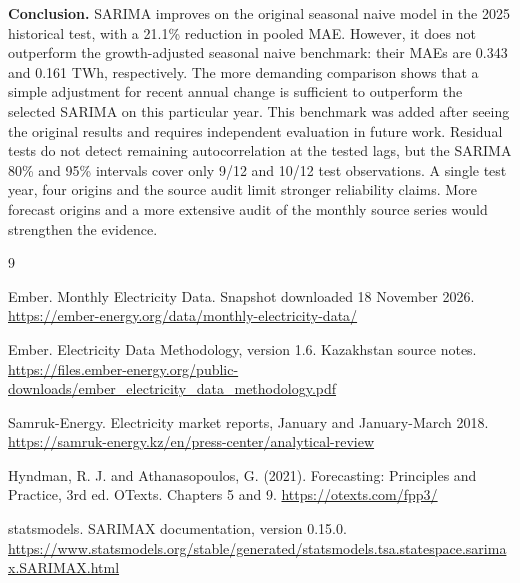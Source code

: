 \documentclass[11pt,a4paper,twoside,reqno]{amsart}
\numberwithin{equation}{section}
\begin{document}
\textbf{Conclusion.} SARIMA improves on the original seasonal naive model in the 2025 historical test, with a 21.1\% reduction in pooled MAE. However, it does not outperform the growth-adjusted seasonal naive benchmark: their MAEs are 0.343 and 0.161 TWh, respectively. The more demanding comparison shows that a simple adjustment for recent annual change is sufficient to outperform the selected SARIMA on this particular year. This benchmark was added after seeing the original results and requires independent evaluation in future work. Residual tests do not detect remaining autocorrelation at the tested lags, but the SARIMA 80\% and 95\% intervals cover only 9/12 and 10/12 test observations. A single test year, four origins and the source audit limit stronger reliability claims. More forecast origins and a more extensive audit of the monthly source series would strengthen the evidence.

\begin{thebibliography}{9}

 Ember. Monthly Electricity Data. Snapshot downloaded 18 November 2026. \newline\url{https://ember-energy.org/data/monthly-electricity-data/}

 Ember. Electricity Data Methodology, version 1.6. Kazakhstan source notes. \newline\url{https://files.ember-energy.org/public-downloads/ember_electricity_data_methodology.pdf}

 Samruk-Energy. Electricity market reports, January and January-March 2018. \newline\url{https://samruk-energy.kz/en/press-center/analytical-review}

 Hyndman, R. J. and Athanasopoulos, G. (2021). Forecasting: Principles and Practice, 3rd ed. OTexts. Chapters 5 and 9. \newline\url{https://otexts.com/fpp3/}

 statsmodels. SARIMAX documentation, version 0.15.0. \newline\url{https://www.statsmodels.org/stable/generated/statsmodels.tsa.statespace.sarimax.SARIMAX.html}


\end{thebibliography}
\end{document}
